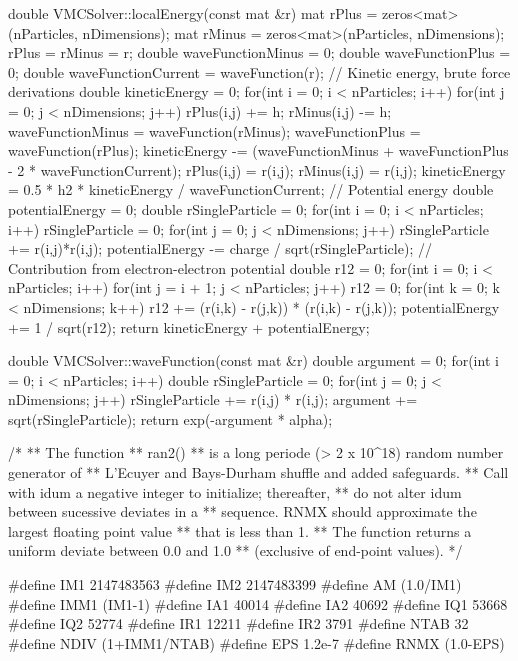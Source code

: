 \documentclass[%
twoside,                 %
final,                   %
10pt]{article}
\begin{document}
double VMCSolver::localEnergy(const mat &r)
{
    mat rPlus = zeros<mat>(nParticles, nDimensions);
    mat rMinus = zeros<mat>(nParticles, nDimensions);
    rPlus = rMinus = r;
    double waveFunctionMinus = 0;
    double waveFunctionPlus = 0;
    double waveFunctionCurrent = waveFunction(r);
    // Kinetic energy, brute force derivations
    double kineticEnergy = 0;
    for(int i = 0; i < nParticles; i++) {
        for(int j = 0; j < nDimensions; j++) {
            rPlus(i,j) += h;
            rMinus(i,j) -= h;
            waveFunctionMinus = waveFunction(rMinus);
            waveFunctionPlus = waveFunction(rPlus);
            kineticEnergy -= (waveFunctionMinus + waveFunctionPlus - 2 * waveFunctionCurrent);
            rPlus(i,j) = r(i,j);
            rMinus(i,j) = r(i,j);
        }
    }
    kineticEnergy = 0.5 * h2 * kineticEnergy / waveFunctionCurrent;
    // Potential energy
    double potentialEnergy = 0;
    double rSingleParticle = 0;
    for(int i = 0; i < nParticles; i++) {
        rSingleParticle = 0;
        for(int j = 0; j < nDimensions; j++) {
            rSingleParticle += r(i,j)*r(i,j);
        }
        potentialEnergy -= charge / sqrt(rSingleParticle);
    }
    // Contribution from electron-electron potential
    double r12 = 0;
    for(int i = 0; i < nParticles; i++) {
        for(int j = i + 1; j < nParticles; j++) {
            r12 = 0;
            for(int k = 0; k < nDimensions; k++) {
                r12 += (r(i,k) - r(j,k)) * (r(i,k) - r(j,k));
            }
            potentialEnergy += 1 / sqrt(r12);
        }
    }
    return kineticEnergy + potentialEnergy;
}

double VMCSolver::waveFunction(const mat &r)
{
    double argument = 0;
    for(int i = 0; i < nParticles; i++) {
        double rSingleParticle = 0;
        for(int j = 0; j < nDimensions; j++) {
            rSingleParticle += r(i,j) * r(i,j);
        }
        argument += sqrt(rSingleParticle);
    }
    return exp(-argument * alpha);
}

/*
** The function
**         ran2()
** is a long periode (> 2 x 10^18) random number generator of
** L'Ecuyer and Bays-Durham shuffle and added safeguards.
** Call with idum a negative integer to initialize; thereafter,
** do not alter idum between sucessive deviates in a
** sequence. RNMX should approximate the largest floating point value
** that is less than 1.
** The function returns a uniform deviate between 0.0 and 1.0
** (exclusive of end-point values).
*/

#define IM1 2147483563
#define IM2 2147483399
#define AM (1.0/IM1)
#define IMM1 (IM1-1)
#define IA1 40014
#define IA2 40692
#define IQ1 53668
#define IQ2 52774
#define IR1 12211
#define IR2 3791
#define NTAB 32
#define NDIV (1+IMM1/NTAB)
#define EPS 1.2e-7
#define RNMX (1.0-EPS)
\end{document}
